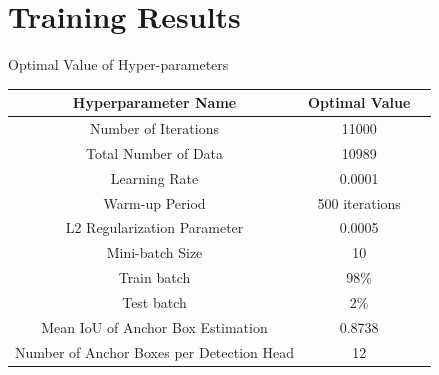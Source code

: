 \documentclass[10pt]{beamer}
\begin{document}


\section{Training Results}

\begin{frame}{Optimal Value of Hyper-parameters}
\begin{table}
    \centering
    \begin{tabular}{|c|c|c|}
        \hline
        \textbf{Hyperparameter Name} & \textbf{Optimal Value} \\
        \hline
        Number of Iterations & 11000 \\
        \hline
        Total Number of Data & 10989\\ 
        \hline
        Learning Rate & 0.0001 \\
        \hline
        Warm-up Period & 500 iterations \\
        \hline
        L2 Regularization Parameter & 0.0005 \\
        \hline  
        Mini-batch Size & 10 \\
        \hline
        Train batch & 98\% \\
        \hline
        Test batch & 2\% \\
        \hline 
        Mean IoU of Anchor Box Estimation & 0.8738 \\
        \hline
        Number of Anchor Boxes per Detection Head & 12 \\
        \hline
    \end{tabular}
\end{table}
\end{frame}
\end{document}
